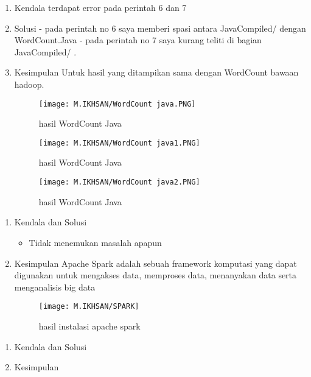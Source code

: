 \clearpage
{}
\begin{enumerate}
\item Kendala
terdapat error pada perintah 6 dan 7

\item Solusi
- pada perintah no 6 saya memberi spasi antara JavaCompiled/ dengan WordCount.Java
- pada perintah no 7 saya kurang teliti di bagian JavaCompiled/ .


\item Kesimpulan
Untuk hasil yang ditampikan sama dengan WordCount bawaan hadoop.

\begin{figure}[!ht]
    \texttt{[image: M.IKHSAN/WordCount java.PNG]}
    \caption{hasil WordCount Java }
    \label{gam:hasil}
    \end{figure}
\begin{figure}[!ht]
    \texttt{[image: M.IKHSAN/WordCount java1.PNG]}
    \caption{hasil WordCount Java }
    \label{gam:hasil}
    \end{figure}
\begin{figure}[!ht]
    \texttt{[image: M.IKHSAN/WordCount java2.PNG]}
    \caption{hasil WordCount Java}
    \label{gam:hasil}
    \end{figure}
\end{enumerate}

\begin{enumerate}
\item Kendala dan Solusi

\begin{itemize}
\item Tidak menemukan masalah apapun
\end{itemize}

\item Kesimpulan
\newline
Apache Spark adalah sebuah framework komputasi yang dapat digunakan untuk mengakses data, memproses data, menanyakan data serta menganalisis big data

\begin{figure}[!ht]
\texttt{[image: M.IKHSAN/SPARK]}
\caption{hasil instalasi apache spark }
\label{gam:hasil instalasi spark}
\end{figure}
\end{enumerate}

\begin{enumerate}
\item Kendala dan Solusi

\item Kesimpulan

\end{enumerate}